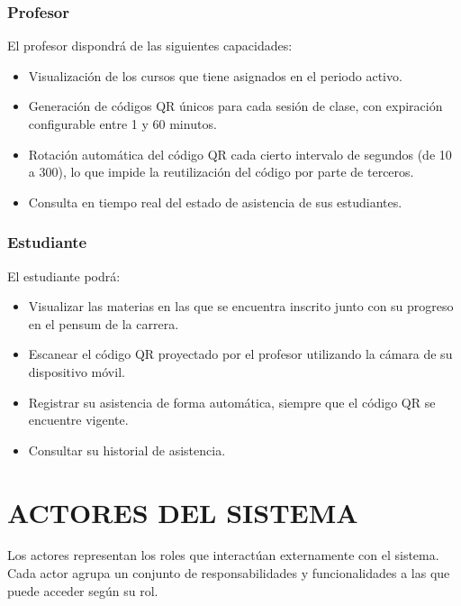 \documentclass[12pt, letterpaper, oneside]{report}
\begin{document}
\subsection{Profesor}

El profesor dispondr\'a de las siguientes capacidades:

\begin{itemize}
  \item Visualizaci\'on de los cursos que tiene asignados en el periodo activo.
  \item Generaci\'on de c\'odigos QR \'unicos para cada sesi\'on de clase, con expiraci\'on configurable entre 1 y 60 minutos.
  \item Rotaci\'on autom\'atica del c\'odigo QR cada cierto intervalo de segundos (de 10 a 300), lo que impide la reutilizaci\'on del c\'odigo por parte de terceros.
  \item Consulta en tiempo real del estado de asistencia de sus estudiantes.
\end{itemize}

\subsection{Estudiante}

El estudiante podr\'a:

\begin{itemize}
  \item Visualizar las materias en las que se encuentra inscrito junto con su progreso en el pensum de la carrera.
  \item Escanear el c\'odigo QR proyectado por el profesor utilizando la c\'amara de su dispositivo m\'ovil.
  \item Registrar su asistencia de forma autom\'atica, siempre que el c\'odigo QR se encuentre vigente.
  \item Consultar su historial de asistencia.
\end{itemize}

\newpage

\chapter{ACTORES DEL SISTEMA}

Los actores representan los roles que interact\'uan externamente con el sistema. Cada actor agrupa un conjunto de responsabilidades y funcionalidades a las que puede acceder seg\'un su rol.
\end{document}
